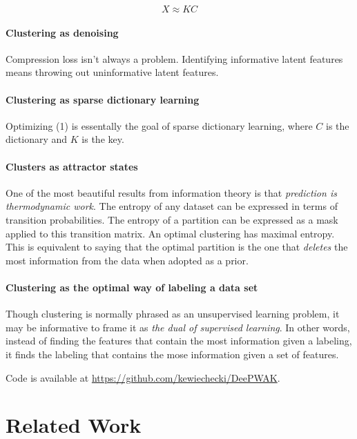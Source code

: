 \begin{equation}
  X \approx KC
\end{equation}

\paragraph{Clustering as denoising}
Compression loss isn't always a problem.
Identifying informative latent features means throwing out uninformative latent features.

\paragraph{Clustering as sparse dictionary learning}
Optimizing (1) is essentally the goal of sparse dictionary learning, where
$C$ is the dictionary and $K$ is the key.


\paragraph{Clusters as attractor states}
One of the most beautiful results from information theory is that \textit{prediction is thermodynamic work}.
The entropy of any dataset can be expressed in terms of transition probabilities.
The entropy of a partition can be expressed as a mask applied to this transition matrix.
An optimal clustering has maximal entropy\cite{e17010151}.
This is equivalent to saying that the optimal partition is the one that \textit{deletes} the most information from the data when adopted as a prior.

\paragraph{Clustering as the optimal way of labeling a data set}
Though clustering is normally phrased as an unsupervised learning problem,
it may be informative to frame it as \textit{the dual of supervised learning}.
In other words, instead of finding the features that contain the most information given a labeling,
it finds the labeling that contains the mose information given a set of features.


Code is available at \url{https://github.com/kewiechecki/DeePWAK}.

\section{Related Work}

